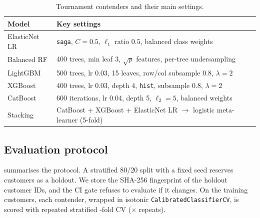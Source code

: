 \documentclass[conference]{IEEEtran}
\newcommand{\code}[1]{\texttt{#1}}
\begin{document}
\begin{table}[t]
\centering
\caption{Tournament contenders and their main settings.}
\label{tab:hyper}
\footnotesize
\begin{tabularx}{\columnwidth}{@{}l L@{}}
\toprule
\textbf{Model} & \textbf{Key settings}\\
\midrule
ElasticNet LR & \code{saga}, $C=0.5$, $\ell_1$ ratio $0.5$, balanced class weights\\
Balanced RF & 400 trees, min leaf 3, $\sqrt{p}$ features, per-tree undersampling\\
LightGBM & 500 trees, lr $0.03$, 15 leaves, row/col subsample $0.8$, $\lambda=2$\\
XGBoost & 400 trees, lr $0.03$, depth 4, \code{hist}, subsample $0.8$, $\lambda=2$\\
CatBoost & 600 iterations, lr $0.04$, depth 5, $\ell_2=5$, balanced weights\\
Stacking & CatBoost + XGBoost + ElasticNet LR $\rightarrow$ logistic meta-learner (5-fold)\\
\bottomrule
\end{tabularx}
\end{table}

\subsection{Evaluation protocol}
 summarises the protocol. A stratified 80/20 split with a fixed seed reserves
\NHoldout{} customers as a holdout. We store the SHA-256 fingerprint of the holdout customer IDs,
and the CI gate refuses to evaluate if it changes. On the \NTrain{} training customers, each
contender, wrapped in isotonic \code{CalibratedClassifierCV}, is scored with repeated stratified
\CVFolds{}-fold CV ($\times$\CVRepeats{} repeats).
\end{document}
